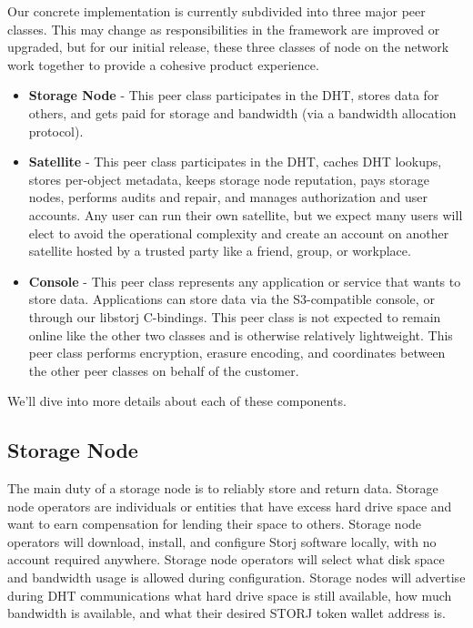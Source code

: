 \documentclass[a4paper,10pt]{article} \usepackage[utf8]{inputenc}
\begin{document}
Our concrete implementation is currently subdivided into three major peer
classes. This may change as responsibilities in the framework are improved or
upgraded, but for our initial release, these three classes of node on the
network work together to provide a cohesive product experience.

\begin{itemize}
\item {\bf Storage Node} - This peer class participates in the DHT, stores data 
for
  others, and gets paid for storage and bandwidth (via a bandwidth allocation
  protocol).
\item {\bf Satellite} - This peer class participates in the DHT, caches
  DHT lookups, stores per-object metadata, keeps storage node reputation, pays
  storage nodes, performs audits and repair, and manages authorization and user
  accounts. Any user can run their own satellite, but we expect many users
  will elect to avoid the operational complexity and create an account on
  another satellite hosted by a trusted party like a friend, group, or
  workplace.
\item {\bf Console} - This peer class represents any application or
  service that wants to store data. Applications can store data via the
  S3-compatible console, or through our libstorj C-bindings. This peer class
  is not expected to remain online like the other two classes and is otherwise
  relatively lightweight. This peer class performs encryption, erasure encoding,
  and coordinates between the other peer classes on behalf of the customer.
\end{itemize}

We'll dive into more details about each of these components.

\subsection{Storage Node}

The main duty of a storage node is to reliably store and return data. 
Storage node operators
are individuals or entities that have excess hard drive space and want to earn
compensation for lending their space to others. Storage node operators will 
download,
install, and configure Storj software locally, with no account required
anywhere. Storage node operators will select what disk space and bandwidth usage
is allowed during configuration.
Storage nodes will advertise during DHT communications what hard drive space is 
still
available, how much bandwidth is available, and what their desired STORJ token
wallet address is.
\end{document}
